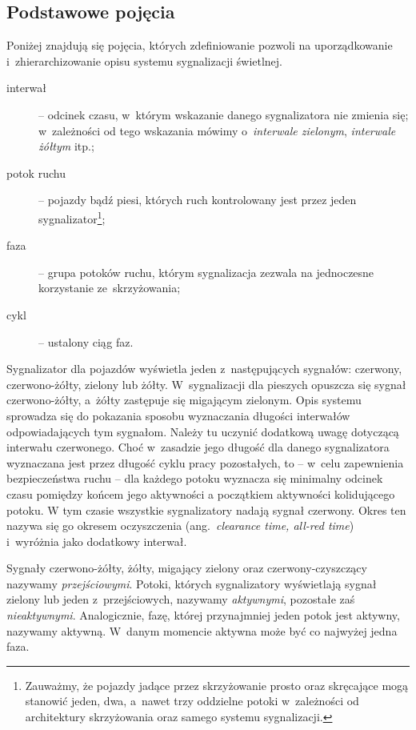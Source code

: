 \documentclass{pracamgr}
\newcommand{\ang}[1]{(ang.~\emph{#1})}
\theoremstyle{plain}
\begin{document}
\subsection{Podstawowe pojęcia}
\label{ss:pojecia}

Poniżej znajdują się pojęcia, których zdefiniowanie pozwoli na
uporządkowanie i~zhierarchizowanie opisu systemu sygnalizacji
świetlnej.
\begin{description}
  \item[interwał] -- odcinek czasu, w~którym wskazanie danego
  sygnalizatora nie zmienia się; w~zależności od tego wskazania mówimy
  o~\emph{interwale zielonym}, \emph{interwale żółtym} itp.;
  \item[potok ruchu] -- pojazdy bądź piesi, których ruch kontrolowany
  jest przez jeden sygnalizator\footnote{Zauważmy, że pojazdy jadące
    przez skrzyżowanie prosto oraz skręcające mogą stanowić jeden,
    dwa, a~nawet trzy oddzielne potoki w~zależności od architektury
    skrzyżowania oraz samego systemu sygnalizacji.};
  \item[faza] -- grupa potoków ruchu, którym sygnalizacja zezwala na
  jednoczesne korzystanie ze~skrzyżowania;
  \item[cykl] -- ustalony ciąg faz.
\end{description}

Sygnalizator dla pojazdów wyświetla jeden z~następujących sygnałów:
czerwony, czerwono-żółty, zielony lub żółty. W~sygnalizacji dla
pieszych opuszcza się sygnał czerwono-żółty, a~żółty zastępuje się
migającym zielonym. Opis systemu sprowadza się do pokazania sposobu
wyznaczania długości interwałów odpowiadających tym sygnałom. Należy
tu uczynić dodatkową uwagę dotyczącą interwału czerwonego. Choć w~zasadzie jego
długość dla danego sygnalizatora wyznaczana jest przez długość cyklu
pracy pozostałych, to -- w~celu zapewnienia bezpieczeństwa ruchu -- dla
każdego potoku wyznacza się minimalny odcinek czasu pomiędzy końcem
jego aktywności a początkiem aktywności kolidującego potoku. W tym
czasie wszystkie sygnalizatory nadają sygnał czerwony. Okres ten
nazywa się go okresem oczyszczenia \ang{clearance time, all-red time}
i~wyróżnia jako dodatkowy interwał.

Sygnały czerwono-żółty, żółty, migający zielony oraz
czerwony-czyszczący nazywamy \emph{przejściowymi}. Potoki, których
sygnalizatory wyświetlają sygnał zielony lub jeden z~przejściowych,
nazywamy \emph{aktywnymi}, pozostałe zaś
\emph{nieaktywnymi}. Analogicznie, fazę, której przynajmniej jeden
potok jest aktywny, nazywamy aktywną. W~danym momencie aktywna może być
co najwyżej jedna faza.
\end{document}
